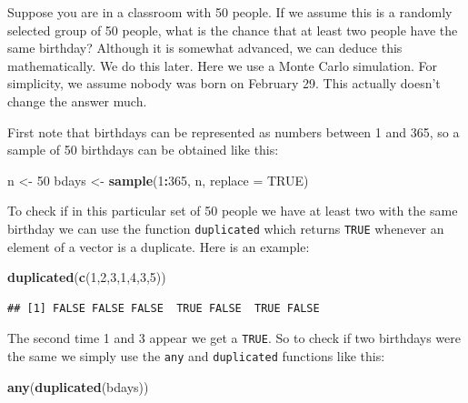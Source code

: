 \documentclass[
  openany]{book}
\newenvironment{Shaded}{\begin{snugshade}}{\end{snugshade}}
\newcommand{\DataTypeTok}[1]{\textcolor[rgb]{0.13,0.29,0.53}{#1}}
\newcommand{\DecValTok}[1]{\textcolor[rgb]{0.00,0.00,0.81}{#1}}
\newcommand{\KeywordTok}[1]{\textcolor[rgb]{0.13,0.29,0.53}{\textbf{#1}}}
\newcommand{\NormalTok}[1]{#1}
\newcommand{\OperatorTok}[1]{\textcolor[rgb]{0.81,0.36,0.00}{\textbf{#1}}}
\newcommand{\OtherTok}[1]{\textcolor[rgb]{0.56,0.35,0.01}{#1}}
\newcommand{\StringTok}[1]{\textcolor[rgb]{0.31,0.60,0.02}{#1}}
\begin{document}
Suppose you are in a classroom with 50 people. If we assume this is a randomly selected group of 50 people, what is the chance that at least two people have the same birthday? Although it is somewhat advanced, we can deduce this mathematically. We do this later. Here we use a Monte Carlo simulation. For simplicity, we assume nobody was born on February 29. This actually doesn't change the answer much.

First note that birthdays can be represented as numbers between 1 and 365, so a sample of 50 birthdays can be obtained like this:

\begin{Shaded}
\begin{Highlighting}[]
\NormalTok{n <-}\StringTok{ }\DecValTok{50}
\NormalTok{bdays <-}\StringTok{ }\KeywordTok{sample}\NormalTok{(}\DecValTok{1}\OperatorTok{:}\DecValTok{365}\NormalTok{, n, }\DataTypeTok{replace =} \OtherTok{TRUE}\NormalTok{)}
\end{Highlighting}
\end{Shaded}

To check if in this particular set of 50 people we have at least two with the same birthday we can use the function \texttt{duplicated} which returns \texttt{TRUE} whenever an element of a vector is a duplicate. Here is an example:

\begin{Shaded}
\begin{Highlighting}[]
\KeywordTok{duplicated}\NormalTok{(}\KeywordTok{c}\NormalTok{(}\DecValTok{1}\NormalTok{,}\DecValTok{2}\NormalTok{,}\DecValTok{3}\NormalTok{,}\DecValTok{1}\NormalTok{,}\DecValTok{4}\NormalTok{,}\DecValTok{3}\NormalTok{,}\DecValTok{5}\NormalTok{))}
\end{Highlighting}
\end{Shaded}

\begin{verbatim}
## [1] FALSE FALSE FALSE  TRUE FALSE  TRUE FALSE
\end{verbatim}

The second time 1 and 3 appear we get a \texttt{TRUE}. So to check if two birthdays were the same we simply use the \texttt{any} and \texttt{duplicated} functions like this:

\begin{Shaded}
\begin{Highlighting}[]
\KeywordTok{any}\NormalTok{(}\KeywordTok{duplicated}\NormalTok{(bdays))}
\end{Highlighting}
\end{Shaded}
\end{document}
